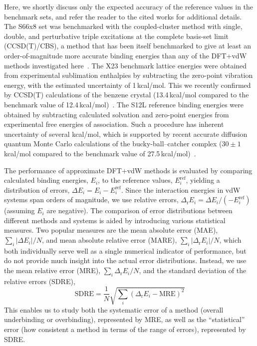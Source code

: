 Here, we shortly discuss only the expected accuracy of the reference values in the benchmark sets, and refer the reader to the cited works for additional details.
The S66x8 set was benchmarked with the coupled-cluster method with single, double, and perturbative triple excitations at the complete basis-set limit (CCSD(T)/CBS), a method that has been itself benchmarked to give at least an order-of-magnitude more accurate binding energies than any of the DFT+vdW methods investigated here~\cite{RezacJCTC13}. %
The X23 benchmark lattice energies were obtained from experimental sublimation enthalpies by subtracting the zero-point vibration energy, with the estimated uncertainty of 1\,kcal/mol.
This we recently confirmed by CCSD(T) calculations of the benzene crystal (13.4\,kcal/mol compared to the benchmark value of 12.4\,kcal/mol)~\cite{YangS14}. %
The S12L reference binding energies were obtained by subtracting calculated solvation and zero-point energies from experimental free energies of association.
Such a procedure has inherent uncertainty of several kcal/mol, which is supported by recent accurate diffusion quantum Monte Carlo calculations of the bucky-ball--catcher complex ($30\pm1$\,kcal/mol compared to the benchmark value of 27.5\,kcal/mol)~\cite{ZenPRB16}.

The performance of approximate DFT+vdW methods is evaluated by comparing calculated binding energies, $E_i$, to the reference values, $E_i^\text{ref}$, yielding a distribution of errors, $\Delta E_i=E_i-E_i^\text{ref}$.
Since the interaction energies in vdW systems span orders of magnitude, we use relative errors, $\Delta_\mathrm rE_i=\Delta E_i/(-E_i^\text{ref})$ (assuming $E_i$ are negative).
The comparison of error distributions between different methods and systems is aided by introducing various statistical measures.
Two popular measures are the mean absolute error (MAE), $\sum_i\lvert\Delta E_i\rvert/N$, and mean absolute relative error (MARE), $\sum_i\lvert\Delta_\mathrm rE_i\rvert/N$, which both individually serve well as a single numerical indicator of performance, but do not provide much insight into the actual error distributions.
Instead, we use the mean relative error (MRE), $\sum_i\Delta_\mathrm rE_i/N$, and the standard deviation of the relative errors (SDRE),
\[ \text{SDRE}=\frac1N\sqrt{\sum_i(\Delta_\mathrm rE_i-\text{MRE})^2} \]
This enables us to study both the systematic error of a method (overall underbinding or overbinding), represented by MRE, as well as the ``statistical'' error (how consistent a method in terms of the range of errors), represented by SDRE\@.

